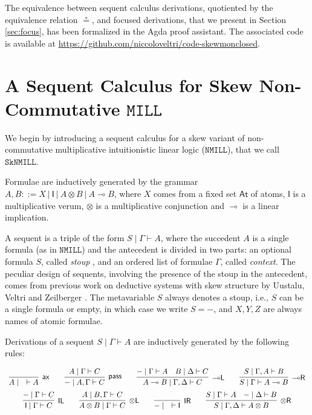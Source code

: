 \documentclass[copyright,creativecommons]{eptcs}
\theoremstyle{definition}
\newcommand{\tl}{\otimes \mathsf{L}}
\newcommand{\tr}{\otimes \mathsf{R}}
\newcommand{\lright}{{\multimap}\mathsf{R}}
\newcommand{\lleft}{{\multimap}\mathsf{L}}
\newcommand{\pass}{\mathsf{pass}}
\newcommand{\unitl}{\mathsf{IL}}
\newcommand{\unitr}{\mathsf{IR}}
\newcommand{\ax}{\mathsf{ax}}
\newcommand{\ot}{\otimes}
\newcommand{\lolli}{\multimap}
\newcommand{\I}{\mathsf{I}}
\newcommand{\MILL}{$\mathtt{MILL}$}
\newcommand{\NMILL}{$\mathtt{NMILL}$}
\newcommand{\SkNMILL}{$\mathtt{SkNMILL}$}
\begin{document}
The equivalence between sequent calculus derivations, quotiented by the equivalence relation $\circeq$, and focused derivations, that we present in Section \ref{sec:focus}, has been formalized in the Agda proof assistant. The associated code is available at \url{https://github.com/niccoloveltri/code-skewmonclosed}.

\section{A Sequent Calculus for Skew Non-Commutative \MILL}\label{sec2}

We begin by introducing a sequent calculus for a skew variant of non-commutative multiplicative intuitionistic linear logic (\NMILL), that we call \SkNMILL.

Formulae are inductively generated by the grammar $A,B ::= X \ | \ \I \ | \ A \ot B \ | \ A \lolli B$, where $X$ comes from a fixed set $\mathsf{At}$ of atoms, $\I$ is a multiplicative verum, $\ot$ is a multiplicative conjunction and $\lolli$ is a linear implication.

A sequent is a triple of the form $S \mid \Gamma \vdash A$, where the succedent $A$ is a single formula (as in \NMILL) and the antecedent is divided in two parts: an optional formula $S$, called \emph{stoup} \cite{girard:constructive:91}, and an ordered list of formulae $\Gamma$, called \emph{context}. The peculiar design of sequents, involving the presence of the stoup in the antecedent, comes from previous work on deductive systems with skew structure by Uustalu, Veltri and Zeilberger \cite{uustalu:sequent:2021,uustalu:proof:nodate,uustalu:deductive:nodate,veltri:coherence:2021}.
The metavariable $S$ always denotes a stoup, i.e., $S$ can be a single formula or empty, in which case we write $S = {-}$, and $X,Y,Z$ are always names of atomic formulae.

Derivations of a sequent $S \mid \Gamma \vdash A$ are inductively generated by the following rules:

\begin{equation}\label{eq:seqcalc}
  \def\arraystretch{2.5}
  \begin{array}{c}
    \infer[\ax]{A \mid \quad \vdash A}{}
    \qquad
    \infer[\pass]{{-} \mid A , \Gamma \vdash C}{A \mid \Gamma \vdash C}
    \qquad
    \infer[\lleft]{A \lolli B \mid \Gamma , \Delta \vdash C}{
      {-} \mid \Gamma \vdash A
      &
      B \mid \Delta \vdash C
    }
    \qquad
    \infer[\lright]{S \mid \Gamma \vdash A \lolli B}{S \mid \Gamma , A \vdash B}
    \\
    \infer[\unitl]{\I \mid \Gamma \vdash C}{{-} \mid \Gamma \vdash C}
    \qquad
    \infer[\tl]{A \ot B \mid \Gamma \vdash C}{A \mid B , \Gamma \vdash C}
    \qquad
    \infer[\unitr]{{-} \mid \quad \vdash \I}{}
    \qquad
    \infer[\tr]{S \mid \Gamma , \Delta \vdash A \ot B}{
      S \mid \Gamma \vdash A
      &
      {-} \mid \Delta \vdash B
    }
  \end{array}
\end{equation}
\end{document}
